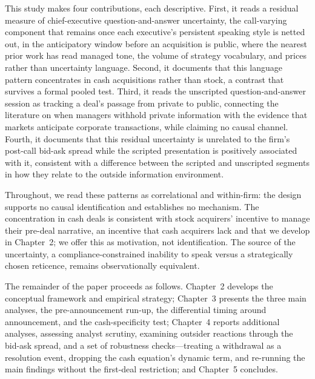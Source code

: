 This study makes four contributions, each descriptive. First, it reads a residual measure of chief-executive question-and-answer uncertainty, the call-varying component that remains once each executive's persistent speaking style is netted out, in the anticipatory window before an acquisition is public, where the nearest prior work has read managed tone, the volume of strategy vocabulary, and prices rather than uncertainty language. Second, it documents that this language pattern concentrates in cash acquisitions rather than stock, a contrast that survives a formal pooled test. Third, it reads the unscripted question-and-answer session as tracking a deal's passage from private to public, connecting the literature on when managers withhold private information with the evidence that markets anticipate corporate transactions, while claiming no causal channel. Fourth, it documents that this residual uncertainty is unrelated to the firm's post-call bid-ask spread while the scripted presentation is positively associated with it, consistent with a difference between the scripted and unscripted segments in how they relate to the outside information environment.

Throughout, we read these patterns as correlational and within-firm: the design supports no causal identification and establishes no mechanism. The concentration in cash deals is consistent with stock acquirers' incentive to manage their pre-deal narrative, an incentive that cash acquirers lack and that we develop in Chapter~2; we offer this as motivation, not identification. The source of the uncertainty, a compliance-constrained inability to speak versus a strategically chosen reticence, remains observationally equivalent.

The remainder of the paper proceeds as follows. Chapter~2 develops the conceptual framework and empirical strategy; Chapter~3 presents the three main analyses, the pre-announcement run-up, the differential timing around announcement, and the cash-specificity test; Chapter~4 reports additional analyses, assessing analyst scrutiny, examining outsider reactions through the bid-ask spread, and a set of robustness checks---treating a withdrawal as a resolution event, dropping the cash equation's dynamic term, and re-running the main findings without the first-deal restriction; and Chapter~5 concludes.
